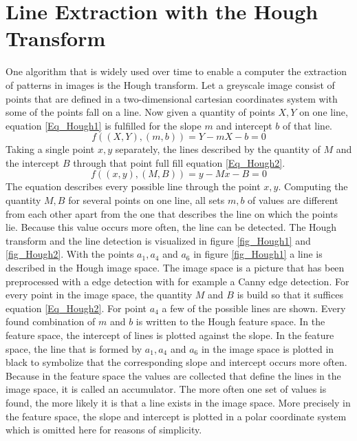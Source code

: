   \section{Line Extraction with the Hough Transform} \label{Houghtransf}
   One algorithm that is widely used over time to enable a computer the extraction of patterns in images is the Hough transform. Let a greyscale  image consist of points that are defined in a two-dimensional cartesian coordinates system with some of the points fall on a line. Now given a quantity of points $X,Y$ on one line, equation \ref{Eq_Hough1} is fulfilled for the slope $m$ and intercept $b$ of that line.
   \begin{equation} 
   \label{Eq_Hough1}
   f((X,Y),(m,b)) = Y-mX-b = 0 
   \end{equation}
   Taking a single point $x,y$ separately, the lines described by the quantity of $M$ and the intercept $B$ through that point full fill equation \ref{Eq_Hough2}.
   \begin{equation} 
   \label{Eq_Hough2}
   f((x,y),(M,B)) = y-Mx-B = 0 
   \end{equation}
   The equation describes every possible line through the point $x,y$. Computing the quantity $M,B$ for several points on one line, all sets $m,b$ of values are different from each other apart from the one that describes the line on which the points lie. Because this value occurs more often, the line can be detected. The Hough transform and the line detection is visualized in figure \ref{fig_Hough1} and \ref{fig_Hough2}. With the points $a_1,a_4$ and $a_6$ in figure \ref{fig_Hough1} a line is described in the Hough image space. The image space is a picture that has been preprocessed with a edge detection with for example a Canny edge detection. For every point in the image space, the quantity $M$ and $B$ is build so that it suffices equation \ref{Eq_Hough2}. For point $a_4$ a few of the possible lines are shown. Every found combination of $m$ and $b$ is written to the Hough feature space. In the feature space, the intercept of lines is plotted against the slope. In the feature space, the line that is formed by $a_1,a_4$ and $a_6$ in the image space is plotted in black to symbolize that the corresponding slope and intercept occurs more often. Because in the feature space the values are collected that define the lines in the image space, it is called an accumulator. The more often one set of values is found, the more likely it is that a line exists in the image space.
   More precisely in the feature space, the slope and intercept is plotted in a polar coordinate system which is omitted here for reasons of simplicity. \cite{StandHough}
   
